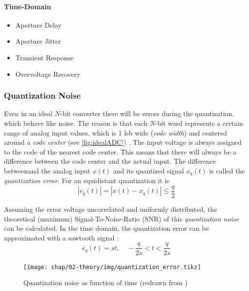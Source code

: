 \paragraph{Time-Domain}
\begin{itemize}
	\item Aperture Delay
	\item Aperture Jitter
	\item Transient Response
	\item Overvoltage Recovery
\end{itemize}

\subsubsection{Quantization Noise}
Even in an ideal $N$-bit converter there will be errors during the quantization, which behave like noise.
The reason is that each $N$-bit word represents a certain range of analog input values, which is 1 \gls{lsb} wide (\textit{code width}) and centered around a \textit{code center} (see \autoref{fig:idealADC}) \cite{Lundberg}.
The input voltage is always assigned to the code of the nearest code center. 
This means that there will always be a difference between the code center and the actual input.
The difference betweenand the analog input $x(t)$ and its quantized signal $x_q(t)$ is called the \textit{quantization error}.
For an equidistant quantization it is
\begin{equation}
	\left| e_q(t) \right| = \left| x(t) - x_q(t) \right| \leq \frac{q}{2}
\end{equation} 
\cite{puente2015}

Assuming the error voltage uncorrelated and uniformly distributed, the theoretical (maximum) Signal-To-Noise-Ratio (SNR) of this \textit{quantization noise} can be calculated. In the time domain, the quantization error can be approximated with a sawtooth signal \cite{walt}:
\begin{equation}
	e_q(t) = st, \quad -\frac{q}{2s} < t < \frac{q}{2s} 
\end{equation}

\begin{figure}[tbh]
	\centering
	\texttt{[image: chap/02-theory/img/quantization\_error.tikz]}
	\caption{Quantization noise as function of time (redrawn from \cite{walt})}
	\label{fig:eq}
\end{figure}



